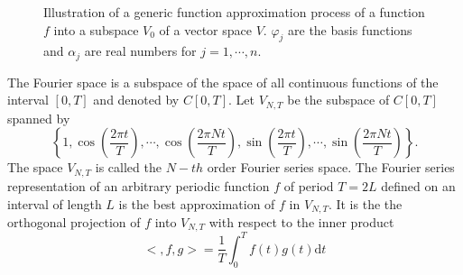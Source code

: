 \documentclass[11pt, oneside]{article}   	%
\begin{document}
\begin{figure}[H]
\begin{center}
\end{center}
\caption{Illustration of a generic function approximation process of a function $f$ into a subspace $V_{0}$ of a vector space $V$. $\varphi_{j}$ are the basis functions and $\alpha_{j}$ are real numbers for $j=1,\cdots,n$.}
\label{figure:il}
\end{figure}
\justify
The Fourier space is a subspace of the space of all continuous functions of the interval $[0, T]$ and denoted by $C[0,T]$. Let $V_{N,T}$ be the subspace of $C[0,T]$ spanned by 
\begin{equation}
\left\{1, \cos\left( \frac{2\pi t}{T} \right), \cdots,\cos\left( \frac{2\pi Nt}{T} \right), \sin\left( \frac{2\pi t}{T} \right), \cdots,\sin\left( \frac{2\pi Nt}{T} \right)   \right\}.
\end{equation}
The space $V_{N,T}$ is called the $N-th$ order Fourier series space. The Fourier series representation of an arbitrary periodic function $f$ of period $T=2L$ defined on an interval of length $L$
is the best approximation of $f$ in $V_{N,T}$. It is the the orthogonal projection of $f$ into $V_{N,T}$ with respect to the inner product
\begin{equation}
<,f,g> = \frac{1}{T}\int_{0}^{T}f(t)g(t)\mathrm{d}t
\end{equation}
\end{document}
